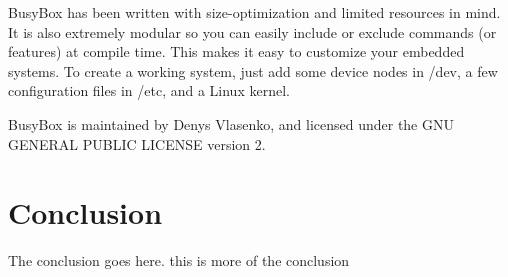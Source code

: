 \documentclass[10pt, conference, compsocconf]{IEEEtran}
\begin{document}
BusyBox has been written with size-optimization and limited resources in mind. It is also extremely modular so you can easily include or exclude commands (or features) at compile time. This makes it easy to customize your embedded systems. To create a working system, just add some device nodes in /dev, a few configuration files in /etc, and a Linux kernel.

BusyBox is maintained by Denys Vlasenko, and licensed under the GNU GENERAL PUBLIC LICENSE version 2.

\section{Conclusion}
The conclusion goes here. this is more of the conclusion








%
%
%




\end{document}
